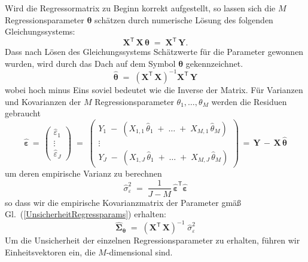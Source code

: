 Wird die Regressormatrix zu Beginn korrekt aufgestellt, so lassen sich die 
$M$ Regressionsparameter $\boldsymbol{\theta}$
schätzen durch numerische Lösung des folgenden Gleichungssystems:
\begin{equation}
\mathbf{X}^\mathsf{T} \, \mathbf{X} \, \boldsymbol{\theta} \; = \;
\mathbf{X}^\mathsf{T} \, \mathbf{Y} .
\label{LsgRegressionGlSys}
\end{equation}
Dass nach Lösen des Gleichungssystems Schätzwerte für
die Parameter gewonnen wurden, wird durch das Dach auf dem Symbol $\boldsymbol{\theta}$ gekennzeichnet.
\begin{equation}
 \boldsymbol{\hat \theta} \; = \;
\left( \mathbf{X}^\mathsf{T}  \, \mathbf{X} \right)^{-1} \mathbf{X}^\mathsf{T} \, \mathbf{Y}
\label{eq:schaetzwerte_fuer_theta}
\end{equation}
wobei hoch minus Eins soviel bedeutet wie die Inverse der Matrix.
Für Varianzen und Kovarianzen der $M$ Regressionsparameter $\theta_1, \dots, \theta_M$
werden die Residuen gebraucht
\begin{equation}
\boldsymbol{\hat \varepsilon} \, =  \, \left(
\begin{array}{c}
\hat \varepsilon_1\\
\vdots \\
\hat \varepsilon_J
\end{array}
\right)  \; = \;
\left(
\begin{array}{c}
 Y_{1} \; - \; (X_{1,1} \, \hat \theta_1  \; + \; \dots  \; + \;  X_{M,1} \, \hat \theta_{M})\\
\vdots \\
 Y_{J} \; - \; (X_{1,J} \, \hat \theta_1 \; + \; \dots  \; + \;  X_{M,J} \, \hat \theta_{M})
\end{array}
\right) \, = \, 
\mathbf{Y} \, -  \, \mathbf{X} \, \boldsymbol{\hat \theta}
\end{equation}
um deren empirische Varianz zu berechnen
\begin{equation}
\hat \sigma_{\varepsilon}^2 \; = \;
\frac{1}{J-M} \, \boldsymbol{\hat \varepsilon}^\mathsf{T} \boldsymbol{\hat \varepsilon}
\end{equation}
so dass wir die empirische Kovarianzmatrix der Parameter gmäß Gl.~(\ref{UnsicherheitRegressparams}) erhalten:
\begin{equation*}
\boldsymbol{\hat \Sigma}_{\boldsymbol{\theta}} \; = \; 
\left( \mathbf{X}^\mathsf{T}  \, \mathbf{X} \right)^{-1} \;
\hat \sigma_{\varepsilon}^2
\end{equation*}
Um die Unsicherheit der einzelnen Regressionsparameter zu erhalten, führen wir Einheitsvektoren ein, die $M$-dimensional sind.
